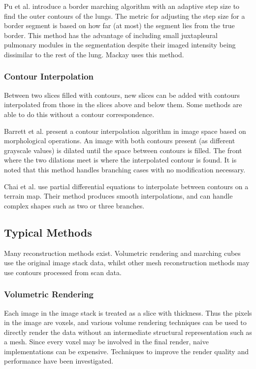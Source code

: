 \documentclass[11p, titlepage]{article}
\begin{document}
Pu et al. \cite{pu2008adaptive} introduce a border marching algorithm with an adaptive step size to find the outer contours of the lungs. The metric for adjusting the step size for a border segment is based on how far (at most) the segment lies from the true border. This method has the advantage of including small juxtapleural pulmonary modules in the segmentation despite their imaged intensity being dissimilar to the rest of the lung. Mackay \cite{mackay2019robust} uses this method.

\subsubsection{Contour Interpolation}

Between two slices filled with contours, new slices can be added with contours interpolated from those in the slices above and below them. Some methods are able to do this without a contour correspondence.

Barrett et al. \cite{barrett1994image} present a contour interpolation algorithm in image space based on morphological operations. An image with both contours present (as different grayscale values) is dilated until the space between contours is filled. The front where the two dilations meet is where the interpolated contour is found. It is noted that this method handles branching cases with no modification necessary.

Chai et al. \cite{chai1998contour} use partial differential equations to interpolate between contours on a terrain map. Their method produces smooth interpolations, and can handle complex shapes such as two or three branches.

\subsection{Typical Methods}

Many reconstruction methods exist. Volumetric rendering and marching cubes use the original image stack data, whilst other mesh reconstruction methods may use contours processed from scan data.

\subsubsection{Volumetric Rendering}

Each image in the image stack is treated as a slice with thickness. Thus the pixels in the image are voxels, and various volume rendering techniques can be used to directly render the data without an intermediate structural representation such as a mesh. Since every voxel may be involved in the final render, naive implementations can be expensive. Techniques to improve the render quality and performance have been investigated.
\end{document}
